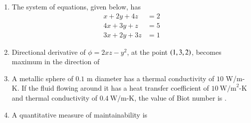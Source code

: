 \documentclass[journal,12pt,onecolumn]{IEEEtran}
\theoremstyle{remark}
\begin{document}
\begin{enumerate}

    \item The system of equations, given below, has
    \begin{align*}
        x+2y+4z &= 2 \\
        4x+3y+z &= 5 \\
        3x+2y+3z &= 1
    \end{align*}
    
    \hfill{}
    \begin{enumerate}
    \end{enumerate}

    \item Directional derivative of $\phi=2xz-y^{2}$, at the point $\left(1, 3, 2\right)$, becomes maximum in the direction of
    
    \hfill{}
    \begin{enumerate}
    \end{enumerate}

    \item A metallic sphere of $0.1$ m diameter has a thermal conductivity of $10$ W/m-K. If the fluid flowing around it has a heat transfer coefficient of $10~\text{W/m}^2\text{-K}$ and thermal conductivity of $0.4~\text{W/m-K}$, the value of Biot number is \underline{\hspace{2cm}}.
    
    \hfill{}

    \item A quantitative measure of maintainability is
    
    \hfill{}
    \begin{enumerate}
    \end{enumerate}


\end{enumerate}
\end{document}
